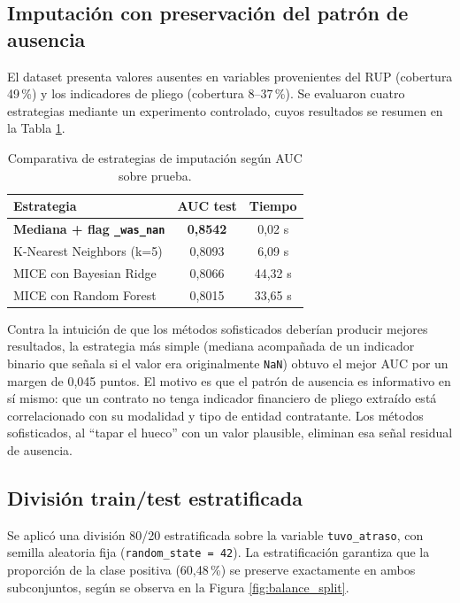 \documentclass[12pt,letterpaper,oneside]{report}
\begin{document}
\subsection{Imputación con preservación del patrón de ausencia}

El dataset presenta valores ausentes en variables provenientes del RUP
(cobertura 49\,\%) y los indicadores de pliego (cobertura 8--37\,\%). Se
evaluaron cuatro estrategias mediante un experimento controlado, cuyos
resultados se resumen en la Tabla \ref{tab:imputacion}.

\begin{table}[h!]
\centering
\caption{Comparativa de estrategias de imputación según AUC sobre prueba.}
\label{tab:imputacion}
\begin{tabular}{lcc}
\toprule
\textbf{Estrategia} & \textbf{AUC test} & \textbf{Tiempo} \\
\midrule
\textbf{Mediana + flag \texttt{\_was\_nan}} & \textbf{0,8542} & 0,02 s \\
K-Nearest Neighbors (k=5) & 0,8093 & 6,09 s \\
MICE con Bayesian Ridge & 0,8066 & 44,32 s \\
MICE con Random Forest & 0,8015 & 33,65 s \\
\bottomrule
\end{tabular}
\end{table}

Contra la intuición de que los métodos sofisticados deberían producir mejores
resultados, la estrategia más simple (mediana acompañada de un indicador
binario que señala si el valor era originalmente \texttt{NaN}) obtuvo el mejor
AUC por un margen de 0,045 puntos. El motivo es que el patrón de ausencia es
informativo en sí mismo: que un contrato no tenga indicador financiero de
pliego extraído está correlacionado con su modalidad y tipo de entidad
contratante. Los métodos sofisticados, al ``tapar el hueco'' con un valor
plausible, eliminan esa señal residual de ausencia.

\subsection{División train/test estratificada}

Se aplicó una división 80/20 estratificada sobre la variable
\texttt{tuvo\_atraso}, con semilla aleatoria fija
(\texttt{random\_state = 42}). La estratificación garantiza que la
proporción de la clase positiva (60,48\,\%) se preserve exactamente en ambos
subconjuntos, según se observa en la Figura \ref{fig:balance_split}.
\end{document}
